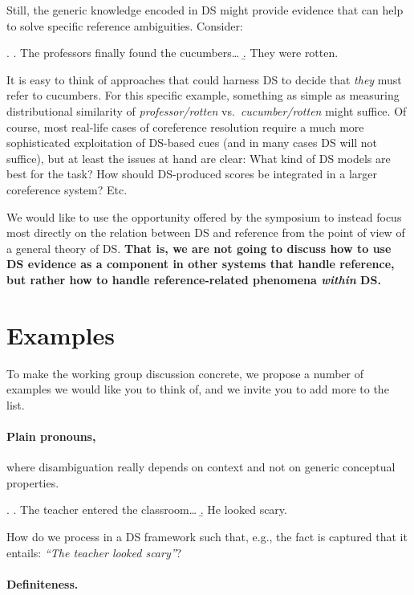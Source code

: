 \documentclass[a4paper,12pt]{article}
\begin{document}
Still, the generic knowledge encoded in DS might provide evidence that
can help to solve specific reference ambiguities. Consider:

\ex. \a. The professors finally found the cucumbers\ldots
\b. They were rotten.

It is easy to think of approaches that could harness DS to decide that
\emph{they} must refer to cucumbers. For this specific example,
something as simple as measuring distributional similarity of
\emph{professor/rotten} vs.~\emph{cucumber/rotten} might suffice. Of
course, most real-life cases of coreference resolution require a much
more sophisticated exploitation of DS-based cues (and in many cases DS
will not suffice), but at least the issues at hand are clear: What
kind of DS models are best for the task? How should DS-produced scores
be integrated in a larger coreference system? Etc.

We would like to use the opportunity offered by the symposium to
instead focus most directly on the relation between DS and reference
from the point of view of a general theory of DS. \textbf{That is, we are not
going to discuss how to use DS evidence as a component in other
systems that handle reference, but rather how to handle
reference-related phenomena \emph{within} DS.}

\section{Examples}
\label{sec:examples}

To make the working group discussion concrete, we propose a number of
examples we would like you to think of, and we invite you to add more
to the list.

\paragraph{Plain pronouns,} where disambiguation really depends on
context and not on generic conceptual properties.

\ex. \a. The teacher entered the classroom\ldots 
\b. He looked scary.

How do we process \Last[b] in a DS framework such that,
e.g.,  the
fact is
captured that it entails: \emph{``The teacher looked
  scary''}?

\paragraph{Definiteness.}
\end{document}
